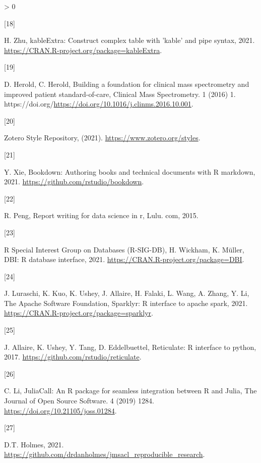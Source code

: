 \documentclass[]{elsarticle} %
\newlength{\csllabelwidth}
\newlength{\cslhangindent}
\newenvironment{CSLReferences}[3] %
 {%
  \setlength{\parindent}{0pt}
  \ifodd #1 \everypar{\setlength{\hangindent}{\cslhangindent}}\ignorespaces\fi
  \ifnum #2 > 0
  \setlength{\parskip}{#2\baselineskip}
  \fi
 }%
 {}
\newcommand{\CSLLeftMargin}[1]{\parbox[t]{\csllabelwidth}{#1}}
\newcommand{\CSLRightInline}[1]{\parbox[t]{\linewidth - \csllabelwidth}{#1}}
\begin{document}
\begin{CSLReferences}{0}{0}
\leavevmode\hypertarget{ref-2021kableextra}{}%
\CSLLeftMargin{{[}18{]} }
\CSLRightInline{H. Zhu, kableExtra: Construct complex table with 'kable'
and pipe syntax, 2021.
\url{https://CRAN.R-project.org/package=kableExtra}.}

\leavevmode\hypertarget{ref-Herold2016}{}%
\CSLLeftMargin{{[}19{]} }
\CSLRightInline{D. Herold, C. Herold, Building a foundation for clinical
mass spectrometry and improved patient standard-of-care, Clinical Mass
Spectrometry. 1 (2016) 1.
https://doi.org/\url{https://doi.org/10.1016/j.clinms.2016.10.001}.}

\leavevmode\hypertarget{ref-Zoterostyles}{}%
\CSLLeftMargin{{[}20{]} }
\CSLRightInline{{Zotero Style Repository}, (2021).
\url{https://www.zotero.org/styles}.}

\leavevmode\hypertarget{ref-xie2021bookdown}{}%
\CSLLeftMargin{{[}21{]} }
\CSLRightInline{Y. Xie, Bookdown: Authoring books and technical
documents with {R} markdown, 2021.
\url{https://github.com/rstudio/bookdown}.}

\leavevmode\hypertarget{ref-peng2015report}{}%
\CSLLeftMargin{{[}22{]} }
\CSLRightInline{R. Peng, Report writing for data science in r, Lulu.
com, 2015.}

\leavevmode\hypertarget{ref-DBI}{}%
\CSLLeftMargin{{[}23{]} }
\CSLRightInline{R Special Interest Group on Databases (R-SIG-DB), H.
Wickham, K. Müller, DBI: R database interface, 2021.
\url{https://CRAN.R-project.org/package=DBI}.}

\leavevmode\hypertarget{ref-sparklyr}{}%
\CSLLeftMargin{{[}24{]} }
\CSLRightInline{J. Luraschi, K. Kuo, K. Ushey, J. Allaire, H. Falaki, L.
Wang, A. Zhang, Y. Li, The Apache Software Foundation, Sparklyr: R
interface to apache spark, 2021.
\url{https://CRAN.R-project.org/package=sparklyr}.}

\leavevmode\hypertarget{ref-Reticulate}{}%
\CSLLeftMargin{{[}25{]} }
\CSLRightInline{J. Allaire, K. Ushey, Y. Tang, D. Eddelbuettel,
Reticulate: R interface to python, 2017.
\url{https://github.com/rstudio/reticulate}.}

\leavevmode\hypertarget{ref-JuliaCall}{}%
\CSLLeftMargin{{[}26{]} }
\CSLRightInline{C. Li, {JuliaCall}: An {R} package for seamless
integration between {R} and {Julia}, The Journal of Open Source
Software. 4 (2019) 1284. \url{https://doi.org/10.21105/joss.01284}.}

\leavevmode\hypertarget{ref-drdanholmesgithub}{}%
\CSLLeftMargin{{[}27{]} }
\CSLRightInline{D.T. Holmes, 2021.
\url{https://github.com/drdanholmes/jmsacl_reproducible_research}.}


\end{CSLReferences}
\end{document}
